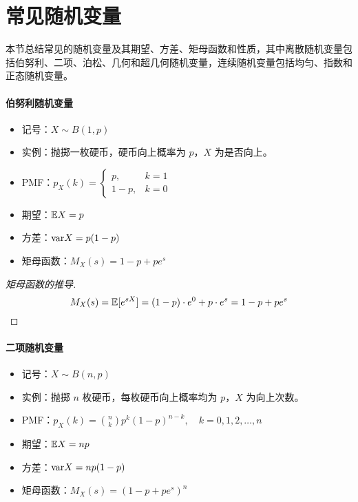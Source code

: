 \section{常见随机变量}
\label{sec:random-variables}

本节总结常见的随机变量及其期望、方差、矩母函数和性质，其中离散随机变量包括伯努利、二项、泊松、几何和超几何随机变量，连续随机变量包括均匀、指数和正态随机变量。


\paragraph{伯努利随机变量}

\begin{itemize}[itemsep=1ex]
    \item 记号：$X\sim B(1,p)$
    \item 实例：抛掷一枚硬币，硬币向上概率为 $p$，$X$ 为是否向上。
    \item PMF：$p_X(k)=\begin{cases}p,&k=1\\1-p,&k=0\end{cases}$
    \item 期望：$\mathbb{E} X=p$
    \item 方差：$\mathrm{var} X=p(1-p)$
    \item 矩母函数：$M_X(s)=1-p+pe^s$
\end{itemize}

\begin{proof}[矩母函数的推导]
\[
M_X(s)=\mathbb{E}[e^{sX}]=(1-p)\cdot e^{0}+p\cdot e^{s}=1-p+pe^s
\]
\end{proof}

\paragraph{二项随机变量}

\begin{itemize}[itemsep=1ex]
    \item 记号：$X\sim B(n,p)$
    \item 实例：抛掷 $n$ 枚硬币，每枚硬币向上概率均为 $p$，$X$ 为向上次数。
    \item PMF：$p_X(k)=\displaystyle\binom{n}{k}p^k(1-p)^{n-k},\quad k=0,1,2,\ldots,n$
    \item 期望：$\mathbb{E} X=np$
    \item 方差：$\mathrm{var} X=np(1-p)$
    \item 矩母函数：$M_X(s)=(1-p+pe^s)^n$
\end{itemize}


